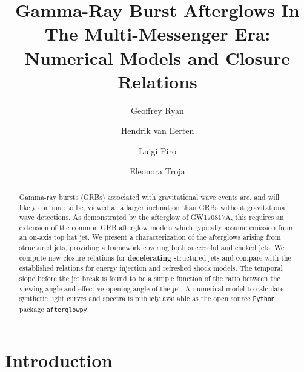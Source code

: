 \documentclass[twocolumn]{aastex62}
\newcommand{\gwbns}{GW170817A}
\newcommand{\afterglowpy}{{\tt afterglowpy}}
\newcommand{\python}{{\tt Python}}
\begin{document}
\title{Gamma-Ray Burst Afterglows In The Multi-Messenger Era: Numerical Models and Closure Relations}


\author[0000-0001-9068-7157]{Geoffrey Ryan}

\author{Hendrik van Eerten}
\author{Luigi Piro}
\author{Eleonora Troja}



\begin{abstract}
	Gamma-ray bursts (GRBs) associated with gravitational wave events are, and will likely continue to be, viewed at a larger inclination than GRBs without gravitational wave detections.  As demonstrated by the afterglow of \gwbns{}, this requires an extension of the common GRB afterglow models which typically assume emission from an on-axis top hat jet.  We present a characterization of the afterglows arising from structured jets, providing a framework covering both successful and choked jets.  We compute new closure relations for {\bf decelerating} structured jets and compare with the established relations for energy injection and refreshed shock models.  The temporal slope before the jet break is found to be a simple function of the ratio between the viewing angle and effective opening angle of the jet.  A numerical model to calculate synthetic light curves and spectra is publicly available as the open source \python{} package \afterglowpy{}.
	
	
\end{abstract}

\section{Introduction}
\end{document}
